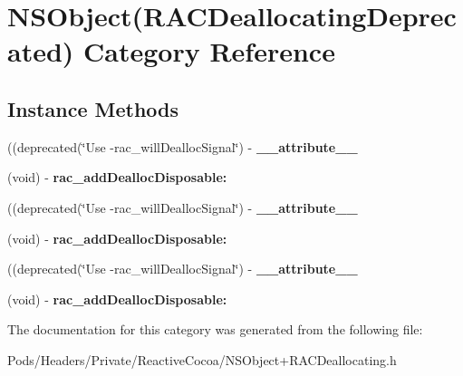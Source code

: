\hypertarget{category_n_s_object_07_r_a_c_deallocating_deprecated_08}{}\section{N\+S\+Object(R\+A\+C\+Deallocating\+Deprecated) Category Reference}
\label{category_n_s_object_07_r_a_c_deallocating_deprecated_08}
\subsection*{Instance Methods}
\begin{DoxyCompactItemize}
\item 
\mbox{\label{category_n_s_object_07_r_a_c_deallocating_deprecated_08_a85425128d4193feb69f013b42751b25a}} 
((deprecated(\char`\"{}Use -\/rac\+\_\+will\+Dealloc\+Signal\char`\"{}) -\/ {\bfseries \+\_\+\+\_\+attribute\+\_\+\+\_\+}
\item 
\mbox{\label{category_n_s_object_07_r_a_c_deallocating_deprecated_08_abd9c75d2f941d1d9709844b07bf51a6f}} 
(void) -\/ {\bfseries rac\+\_\+add\+Dealloc\+Disposable\+:}
\item 
\mbox{\label{category_n_s_object_07_r_a_c_deallocating_deprecated_08_a85425128d4193feb69f013b42751b25a}} 
((deprecated(\char`\"{}Use -\/rac\+\_\+will\+Dealloc\+Signal\char`\"{}) -\/ {\bfseries \+\_\+\+\_\+attribute\+\_\+\+\_\+}
\item 
\mbox{\label{category_n_s_object_07_r_a_c_deallocating_deprecated_08_abd9c75d2f941d1d9709844b07bf51a6f}} 
(void) -\/ {\bfseries rac\+\_\+add\+Dealloc\+Disposable\+:}
\item 
\mbox{\label{category_n_s_object_07_r_a_c_deallocating_deprecated_08_a85425128d4193feb69f013b42751b25a}} 
((deprecated(\char`\"{}Use -\/rac\+\_\+will\+Dealloc\+Signal\char`\"{}) -\/ {\bfseries \+\_\+\+\_\+attribute\+\_\+\+\_\+}
\item 
\mbox{\label{category_n_s_object_07_r_a_c_deallocating_deprecated_08_abd9c75d2f941d1d9709844b07bf51a6f}} 
(void) -\/ {\bfseries rac\+\_\+add\+Dealloc\+Disposable\+:}
\end{DoxyCompactItemize}


The documentation for this category was generated from the following file\+:\begin{DoxyCompactItemize}
\item 
Pods/\+Headers/\+Private/\+Reactive\+Cocoa/N\+S\+Object+\+R\+A\+C\+Deallocating.\+h\end{DoxyCompactItemize}
